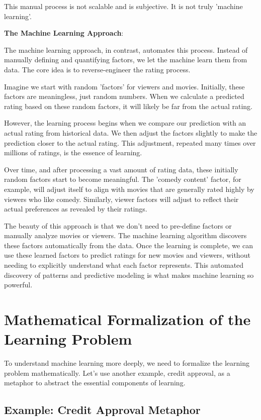\documentclass{article}
\begin{document}
This manual process is not scalable and is subjective. It is not truly 'machine learning'.

\textbf{The Machine Learning Approach}:

The machine learning approach, in contrast, automates this process.  Instead of manually defining and quantifying factors, we let the machine learn them from data.  The core idea is to reverse-engineer the rating process.

Imagine we start with random 'factors' for viewers and movies. Initially, these factors are meaningless, just random numbers.  When we calculate a predicted rating based on these random factors, it will likely be far from the actual rating.

However, the learning process begins when we compare our prediction with an actual rating from historical data.  We then adjust the factors slightly to make the prediction closer to the actual rating.  This adjustment, repeated many times over millions of ratings, is the essence of learning.

Over time, and after processing a vast amount of rating data, these initially random factors start to become meaningful. The 'comedy content' factor, for example, will adjust itself to align with movies that are generally rated highly by viewers who like comedy.  Similarly, viewer factors will adjust to reflect their actual preferences as revealed by their ratings.

The beauty of this approach is that we don't need to pre-define factors or manually analyze movies or viewers. The machine learning algorithm discovers these factors automatically from the data.  Once the learning is complete, we can use these learned factors to predict ratings for new movies and viewers, without needing to explicitly understand what each factor represents.  This automated discovery of patterns and predictive modeling is what makes machine learning so powerful.

\section{Mathematical Formalization of the Learning Problem}

To understand machine learning more deeply, we need to formalize the learning problem mathematically.  Let's use another example, credit approval, as a metaphor to abstract the essential components of learning.

\subsection{Example: Credit Approval Metaphor}
\end{document}
